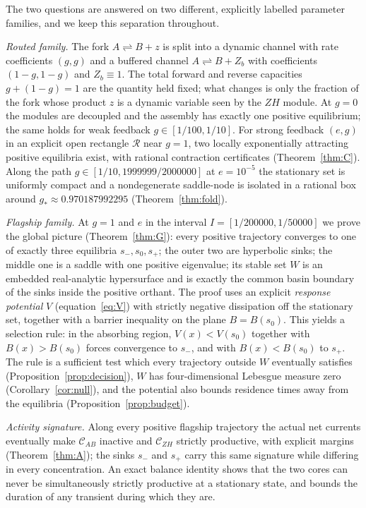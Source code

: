 \documentclass[11pt,a4paper]{article}
\theoremstyle{plain}
\theoremstyle{definition}
\theoremstyle{remark}
\newcommand{\Rr}{\mathcal{R}}
\newcommand{\cAB}{\mathcal{C}_{AB}}
\newcommand{\cZH}{\mathcal{C}_{ZH}}
\begin{document}
The two questions are answered on two different, explicitly labelled parameter families, and we keep this separation throughout.

\emph{Routed family.} The fork $A\rightleftharpoons B+z$ is split into a dynamic channel with rate coefficients $(g,g)$ and a buffered channel $A\rightleftharpoons B+Z_b$ with coefficients $(1-g,1-g)$ and $Z_b\equiv1$. The total forward and reverse capacities $g+(1-g)=1$ are the quantity held fixed; what changes is only the fraction of the fork whose product $z$ is a dynamic variable seen by the $ZH$ module. At $g=0$ the modules are decoupled and the assembly has exactly one positive equilibrium; the same holds for weak feedback $g\in[1/100,1/10]$. For strong feedback $(e,g)$ in an explicit open rectangle $\Rr$ near $g=1$, two locally exponentially attracting positive equilibria exist, with rational contraction certificates (Theorem~\ref{thm:C}). Along the path $g\in[1/10,1999999/2000000]$ at $e=10^{-5}$ the stationary set is uniformly compact and a nondegenerate saddle-node is isolated in a rational box around $g_*\approx0.970187992295$ (Theorem~\ref{thm:fold}).

\emph{Flagship family.} At $g=1$ and $e$ in the interval $I=[1/200000,1/50000]$ we prove the global picture (Theorem~\ref{thm:G}): every positive trajectory converges to one of exactly three equilibria $s_-,s_0,s_+$; the outer two are hyperbolic sinks; the middle one is a saddle with one positive eigenvalue; its stable set $W$ is an embedded real-analytic hypersurface and is exactly the common basin boundary of the sinks inside the positive orthant. The proof uses an explicit \emph{response potential} $V$ (equation~\eqref{eq:V}) with strictly negative dissipation off the stationary set, together with a barrier inequality on the plane $B=B(s_0)$. This yields a selection rule: in the absorbing region, $V(x)<V(s_0)$ together with $B(x)>B(s_0)$ forces convergence to $s_-$, and with $B(x)<B(s_0)$ to $s_+$. The rule is a sufficient test which every trajectory outside $W$ eventually satisfies (Proposition~\ref{prop:decision}), $W$ has four-dimensional Lebesgue measure zero (Corollary~\ref{cor:null}), and the potential also bounds residence times away from the equilibria (Proposition~\ref{prop:budget}).

\emph{Activity signature.} Along every positive flagship trajectory the actual net currents eventually make $\cAB$ inactive and $\cZH$ strictly productive, with explicit margins (Theorem~\ref{thm:A}); the sinks $s_-$ and $s_+$ carry this same signature while differing in every concentration. An exact balance identity shows that the two cores can never be simultaneously strictly productive at a stationary state, and bounds the duration of any transient during which they are.
\end{document}
